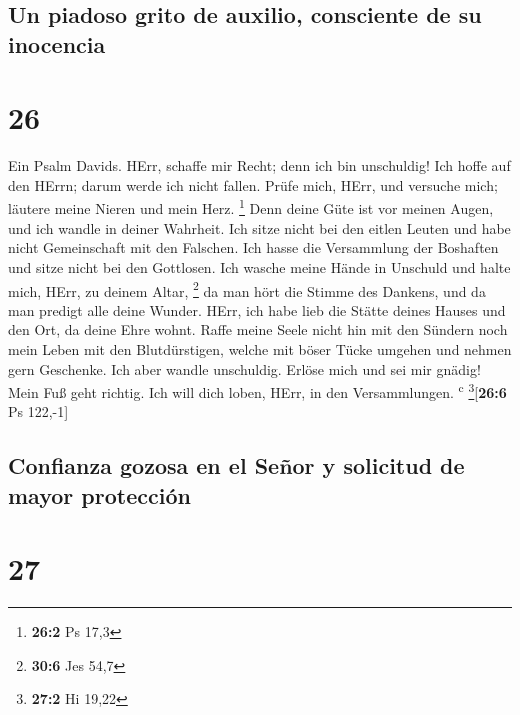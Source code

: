 \hypertarget{un-piadoso-grito-de-auxilio-consciente-de-su-inocencia}{%
\subsection{Un piadoso grito de auxilio, consciente de su
inocencia}\label{un-piadoso-grito-de-auxilio-consciente-de-su-inocencia}}

\hypertarget{section-25}{%
\section{26}\label{section-25}}

 Ein Psalm Davids. HErr, schaffe mir Recht; denn ich bin
unschuldig! Ich hoffe auf den HErrn; darum werde ich nicht fallen.
 Prüfe mich, HErr, und versuche mich; läutere meine Nieren
und mein Herz. \footnote{\textbf{26:2} Ps 17,3}  Denn
deine Güte ist vor meinen Augen, und ich wandle in deiner Wahrheit.
 Ich sitze nicht bei den eitlen Leuten und habe nicht
Gemeinschaft mit den Falschen.  Ich hasse die Versammlung
der Boshaften und sitze nicht bei den Gottlosen.  Ich
wasche meine Hände in Unschuld und halte mich, HErr, zu deinem Altar,
\footnote{\textbf{30:6} Jes 54,7}  da man hört die Stimme
des Dankens, und da man predigt alle deine Wunder.  HErr,
ich habe lieb die Stätte deines Hauses und den Ort, da deine Ehre wohnt.
 Raffe meine Seele nicht hin mit den Sündern noch mein
Leben mit den Blutdürstigen,  welche mit böser Tücke
umgehen und nehmen gern Geschenke.  Ich aber wandle
unschuldig. Erlöse mich und sei mir gnädig!  Mein Fuß
geht richtig. Ich will dich loben, HErr, in den Versammlungen.
\textsuperscript{c} \footnote{\textbf{27:2} Hi 19,22}{[}\textbf{26:6} Ps
122,-1{]}

\hypertarget{confianza-gozosa-en-el-seuxf1or-y-solicitud-de-mayor-protecciuxf3n}{%
\subsection{Confianza gozosa en el Señor y solicitud de mayor
protección}\label{confianza-gozosa-en-el-seuxf1or-y-solicitud-de-mayor-protecciuxf3n}}

\hypertarget{section-26}{%
\section{27}\label{section-26}}

